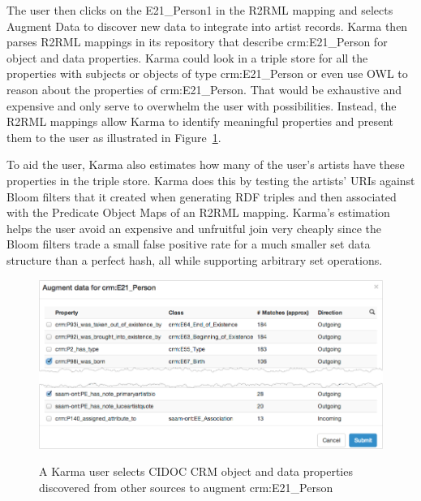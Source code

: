 The user then clicks on the E21\_Person1 in the R2RML mapping and selects Augment Data to discover new data to integrate into artist records.  Karma then parses R2RML mappings in its repository that describe crm:E21\_Person for object and data properties.
Karma could look in a triple store for all the properties with subjects or objects of type crm:E21\_Person or even use OWL to reason about the properties of crm:E21\_Person.
That would be exhaustive and expensive and only serve to overwhelm the user with possibilities.
Instead, the R2RML mappings allow Karma to identify meaningful properties and present them to the user as illustrated in Figure~\ref{fig:search-screenshot}.

To aid the user, Karma also estimates how many of the user's artists have these properties in the triple store.  
Karma does this by testing the artists' URIs against Bloom filters that it created when generating RDF triples and then associated with the Predicate Object Maps of an R2RML mapping.  
Karma's estimation helps the user avoid an expensive and unfruitful join very cheaply since the Bloom filters trade a small false positive rate for a much smaller set data structure than a perfect hash, all while supporting arbitrary set operations.  
\begin{figure}
\begin{center}
\includegraphics[width=4.9in]{images/5-search.png}
\vspace{-3mm}
\caption{A Karma user selects CIDOC CRM object and data properties discovered from other sources to augment crm:E21\_Person}
\vspace{-2mm}
\label{fig:search-screenshot}
\end{center}
\vspace{-1.5em}
\end{figure}